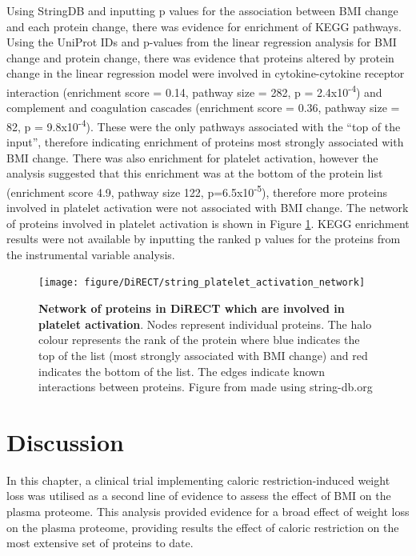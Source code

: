 \documentclass[11pt,twoside]{bristolthesis}
\newcommand{\blandscape}{\begin{landscape}}
\newcommand{\elandscape}{\end{landscape}}
\begin{document}
Using StringDB and inputting p values for the association between BMI change and each protein change, there was evidence for enrichment of KEGG pathways. Using the UniProt IDs and p-values from the linear regression analysis for BMI change and protein change, there was evidence that proteins altered by protein change in the linear regression model were involved in cytokine-cytokine receptor interaction (enrichment score = 0.14, pathway size = 282, p = 2.4x10\textsuperscript{-4}) and complement and coagulation cascades (enrichment score = 0.36, pathway size = 82, p = 9.8x10\textsuperscript{-4}). These were the only pathways associated with the ``top of the input'', therefore indicating enrichment of proteins most strongly associated with BMI change. There was also enrichment for platelet activation, however the analysis suggested that this enrichment was at the bottom of the protein list (enrichment score 4.9, pathway size 122, p=6.5x10\textsuperscript{-5}), therefore more proteins involved in platelet activation were not associated with BMI change. The network of proteins involved in platelet activation is shown in Figure \ref{fig:platelet-enrichment}. KEGG enrichment results were not available by inputting the ranked p values for the proteins from the instrumental variable analysis.

\blandscape



\begin{figure}
\texttt{[image: figure/DiRECT/string\_platelet\_activation\_network]} \caption[Network of proteins in DiRECT which are involved in platelet activation.]{\textbf{Network of proteins in DiRECT which are involved in platelet activation}. Nodes represent individual proteins. The halo colour represents the rank of the protein where blue indicates the top of the list (most strongly associated with BMI change) and red indicates the bottom of the list. The edges indicate known interactions between proteins. Figure from made using string-db.org}\label{fig:platelet-enrichment}
\end{figure}
\elandscape

\hypertarget{discussion-4}{%
\section{Discussion}\label{discussion-4}}

In this chapter, a clinical trial implementing caloric restriction-induced weight loss was utilised as a second line of evidence to assess the effect of BMI on the plasma proteome. This analysis provided evidence for a broad effect of weight loss on the plasma proteome, providing results the effect of caloric restriction on the most extensive set of proteins to date.
\end{document}
